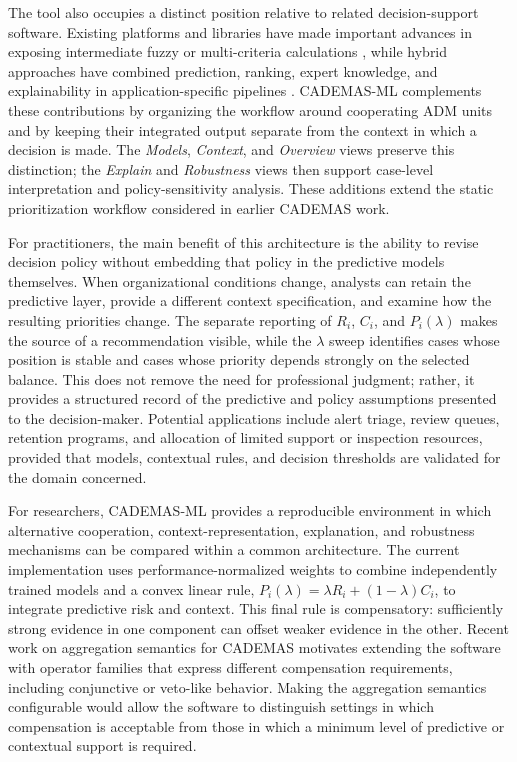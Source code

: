 \documentclass{interact}
\begin{document}
The tool also occupies a distinct position relative to related decision-support software. Existing platforms and libraries have made important advances in exposing intermediate fuzzy or multi-criteria calculations \citep{Wieckowski2024,Chekry2024}, while hybrid approaches have combined prediction, ranking, expert knowledge, and explainability in application-specific pipelines \citep{Ozkurt2025}. CADEMAS-ML complements these contributions by organizing the workflow around cooperating ADM units and by keeping their integrated output separate from the context in which a decision is made. The \textit{Models}, \textit{Context}, and \textit{Overview} views preserve this distinction; the \textit{Explain} and \textit{Robustness} views then support case-level interpretation and policy-sensitivity analysis. These additions extend the static prioritization workflow considered in earlier CADEMAS work.

For practitioners, the main benefit of this architecture is the ability to revise decision policy without embedding that policy in the predictive models themselves. When organizational conditions change, analysts can retain the predictive layer, provide a different context specification, and examine how the resulting priorities change. The separate reporting of $R_i$, $C_i$, and $P_i(\lambda)$ makes the source of a recommendation visible, while the $\lambda$ sweep identifies cases whose position is stable and cases whose priority depends strongly on the selected balance. This does not remove the need for professional judgment; rather, it provides a structured record of the predictive and policy assumptions presented to the decision-maker. Potential applications include alert triage, review queues, retention programs, and allocation of limited support or inspection resources, provided that models, contextual rules, and decision thresholds are validated for the domain concerned.

For researchers, CADEMAS-ML provides a reproducible environment in which alternative cooperation, context-representation, explanation, and robustness mechanisms can be compared within a common architecture. The current implementation uses performance-normalized weights to combine independently trained models and a convex linear rule, $P_i(\lambda)=\lambda R_i+(1-\lambda)C_i$, to integrate predictive risk and context. This final rule is compensatory: sufficiently strong evidence in one component can offset weaker evidence in the other. Recent work on aggregation semantics for CADEMAS \citep{novoa2026aggregation} motivates extending the software with operator families that express different compensation requirements, including conjunctive or veto-like behavior. Making the aggregation semantics configurable would allow the software to distinguish settings in which compensation is acceptable from those in which a minimum level of predictive or contextual support is required.
\end{document}
